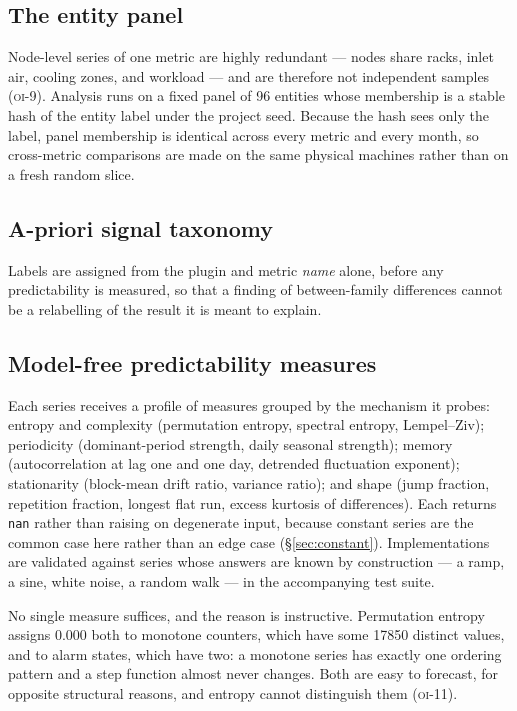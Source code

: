 \documentclass[11pt,a4paper]{article}
\newcommand{\num}[1]{#1}
\newcommand{\oi}[1]{\textsc{oi-#1}}
\begin{document}
\subsection{The entity panel}

Node-level series of one metric are highly redundant --- nodes share racks,
inlet air, cooling zones, and workload --- and are therefore not independent
samples (\oi{9}). Analysis runs on a fixed panel of \num{96} entities whose
membership is a stable hash of the entity label under the project seed. Because
the hash sees only the label, panel membership is identical across every metric
and every month, so cross-metric comparisons are made on the same physical
machines rather than on a fresh random slice.

\subsection{A-priori signal taxonomy}

Labels are assigned from the plugin and metric \emph{name} alone, before any
predictability is measured, so that a finding of between-family differences
cannot be a relabelling of the result it is meant to explain.

\subsection{Model-free predictability measures}

Each series receives a profile of measures grouped by the mechanism it probes:
entropy and complexity (permutation entropy, spectral entropy, Lempel--Ziv);
periodicity (dominant-period strength, daily seasonal strength); memory
(autocorrelation at lag one and one day, detrended fluctuation exponent);
stationarity (block-mean drift ratio, variance ratio); and shape (jump fraction,
repetition fraction, longest flat run, excess kurtosis of differences). Each
returns \texttt{nan} rather than raising on degenerate input, because constant
series are the common case here rather than an edge case
(\S\ref{sec:constant}). Implementations are validated against series whose
answers are known by construction --- a ramp, a sine, white noise, a random walk
--- in the accompanying test suite.

No single measure suffices, and the reason is instructive. Permutation entropy
assigns \num{0.000} both to monotone counters, which have some \num{17850}
distinct values, and to alarm states, which have two: a monotone series has
exactly one ordering pattern and a step function almost never changes. Both are
easy to forecast, for opposite structural reasons, and entropy cannot
distinguish them (\oi{11}).
\end{document}
